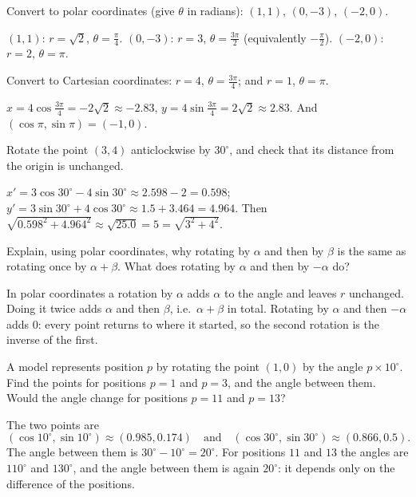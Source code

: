 \sectionexercises

\begin{exercise}
Convert to polar coordinates (give $\theta$ in radians): $(1, 1)$,
$(0, -3)$, $(-2, 0)$.
\end{exercise}
\begin{solution}
$(1,1)$: $r = \sqrt2$, $\theta = \tfrac{\pi}{4}$. $(0,-3)$: $r = 3$,
$\theta = \tfrac{3\pi}{2}$ (equivalently $-\tfrac{\pi}{2}$). $(-2, 0)$: $r = 2$,
$\theta = \pi$.
\end{solution}

\begin{exercise}
Convert to Cartesian coordinates: $r = 4$, $\theta = \frac{3\pi}{4}$; and
$r = 1$, $\theta = \pi$.
\end{exercise}
\begin{solution}
$x = 4\cos\tfrac{3\pi}{4} = -2\sqrt2 \approx -2.83$, $y = 4\sin\tfrac{3\pi}{4}
= 2\sqrt2 \approx 2.83$. And $(\cos\pi, \sin\pi) = (-1, 0)$.
\end{solution}

\begin{exercise}
Rotate the point $(3, 4)$ anticlockwise by $30^\circ$, and check that its
distance from the origin is unchanged.
\end{exercise}
\begin{solution}
$x' = 3\cos30^\circ - 4\sin30^\circ \approx 2.598 - 2 = 0.598$;
$y' = 3\sin30^\circ + 4\cos30^\circ \approx 1.5 + 3.464 = 4.964$. Then
$\sqrt{0.598^2 + 4.964^2} \approx \sqrt{25.0} = 5 = \sqrt{3^2 + 4^2}$.
\end{solution}

\begin{exercise}
Explain, using polar coordinates, why rotating by $\alpha$ and then by $\beta$
is the same as rotating once by $\alpha + \beta$. What does rotating by
$\alpha$ and then by $-\alpha$ do?
\end{exercise}
\begin{solution}
In polar coordinates a rotation by $\alpha$ adds $\alpha$ to the angle and
leaves $r$ unchanged. Doing it twice adds $\alpha$ and then $\beta$, i.e.\
$\alpha + \beta$ in total. Rotating by $\alpha$ and then $-\alpha$ adds $0$:
every point returns to where it started, so the second rotation is the inverse
of the first.
\end{solution}

\begin{exercise}
A model represents position $p$ by rotating the point $(1, 0)$ by the angle
$p \times 10^\circ$. Find the points for positions $p = 1$ and $p = 3$, and the
angle between them. Would the angle change for positions $p = 11$ and
$p = 13$?
\end{exercise}
\begin{solution}
The two points are
\[
  (\cos10^\circ, \sin10^\circ) \approx (0.985, 0.174)
  \quad\text{and}\quad
  (\cos30^\circ, \sin30^\circ) \approx (0.866, 0.5).
\]
The angle between them is $30^\circ - 10^\circ = 20^\circ$. For positions $11$ and $13$ the
angles are $110^\circ$ and $130^\circ$, and the angle between them is again
$20^\circ$: it depends only on the difference of the positions.
\end{solution}

